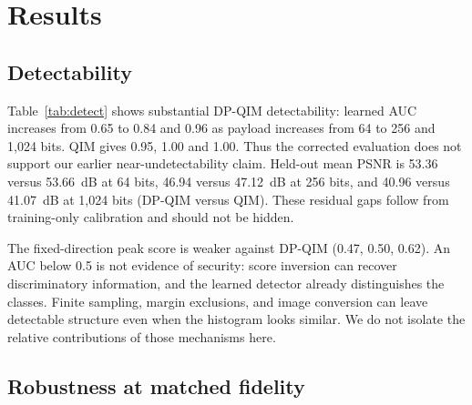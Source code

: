 \documentclass[conference,10pt]{IEEEtran}
\begin{document}
\section{Results}
\label{sec:results}

\subsection{Detectability}

\begin{table}[t]
\centering
\caption{Crop-weighted within-fold detector ROC-AUC with conditional 95\%
source-bootstrap CI (0.5 = chance). Position $(3,3)$, DP-QIM $\epsilon=2$;
QIM fidelity calibrated on training data. PSNR column reports DP-QIM.}
\label{tab:detect}
\resizebox{\columnwidth}{!}{}
\end{table}

Table~\ref{tab:detect} shows substantial DP-QIM detectability: learned AUC
increases from 0.65 to 0.84 and 0.96 as payload increases from 64 to 256 and
1,024 bits. QIM gives 0.95, 1.00 and 1.00. Thus the corrected evaluation does
not support our earlier near-undetectability claim. Held-out mean PSNR is
53.36 versus 53.66~dB at 64 bits, 46.94 versus 47.12~dB at 256 bits, and
40.96 versus 41.07~dB at 1,024 bits (DP-QIM versus QIM). These residual
gaps follow from training-only calibration and should not be hidden.

The fixed-direction peak score is weaker against DP-QIM (0.47, 0.50,
0.62). An AUC below 0.5 is not evidence of security: score inversion can
recover discriminatory information, and the learned detector already
distinguishes the classes. Finite sampling, margin exclusions, and image
conversion can leave detectable structure even when the histogram looks similar.
We do not isolate the relative contributions of those mechanisms here.

\subsection{Robustness at matched fidelity}

\begin{table}[t]
\centering
\caption{Bit accuracy of DP-QIM ($\epsilon=2$, 53.4~dB, position $(3,3)$,
64 bits) and difference from PSNR-interpolated QIM. Bold: conditional
95\% source-bootstrap CI excludes zero.}
\label{tab:robust}
\resizebox{\columnwidth}{!}{}
\end{table}
\end{document}
